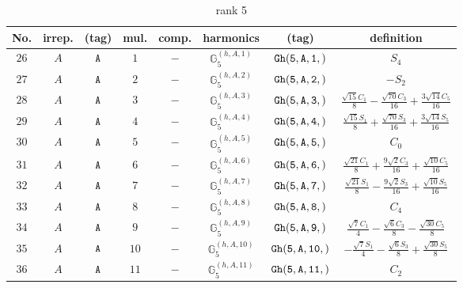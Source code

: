\documentclass[fleqn,8pt]{jsarticle}
\begin{document}
\begin{table}[ht!]
\begin{center}
\caption{rank 5}
\renewcommand{\arraystretch}{1.3}
\begin{tabular}{cccccccc} \hline \hline
No. & irrep. & (tag) & mul. & comp. & harmonics & (tag) & definition \\ \hline
$ 26 $ & $ A $ & $ {\tt A} $ & $ 1 $ & $ - $ & $ \mathbb{G}_{5}^{(h,A,1)} $ & $ {\tt Gh(5,A,1,)} $ & $ S_{4} $ \\
$ 27 $ & $ A $ & $ {\tt A} $ & $ 2 $ & $ - $ & $ \mathbb{G}_{5}^{(h,A,2)} $ & $ {\tt Gh(5,A,2,)} $ & $ - S_{2} $ \\
$ 28 $ & $ A $ & $ {\tt A} $ & $ 3 $ & $ - $ & $ \mathbb{G}_{5}^{(h,A,3)} $ & $ {\tt Gh(5,A,3,)} $ & $ \frac{\sqrt{15} C_{1}}{8} - \frac{\sqrt{70} C_{3}}{16} + \frac{3 \sqrt{14} C_{5}}{16} $ \\
$ 29 $ & $ A $ & $ {\tt A} $ & $ 4 $ & $ - $ & $ \mathbb{G}_{5}^{(h,A,4)} $ & $ {\tt Gh(5,A,4,)} $ & $ \frac{\sqrt{15} S_{1}}{8} + \frac{\sqrt{70} S_{3}}{16} + \frac{3 \sqrt{14} S_{5}}{16} $ \\
$ 30 $ & $ A $ & $ {\tt A} $ & $ 5 $ & $ - $ & $ \mathbb{G}_{5}^{(h,A,5)} $ & $ {\tt Gh(5,A,5,)} $ & $ C_{0} $ \\
$ 31 $ & $ A $ & $ {\tt A} $ & $ 6 $ & $ - $ & $ \mathbb{G}_{5}^{(h,A,6)} $ & $ {\tt Gh(5,A,6,)} $ & $ \frac{\sqrt{21} C_{1}}{8} + \frac{9 \sqrt{2} C_{3}}{16} + \frac{\sqrt{10} C_{5}}{16} $ \\
$ 32 $ & $ A $ & $ {\tt A} $ & $ 7 $ & $ - $ & $ \mathbb{G}_{5}^{(h,A,7)} $ & $ {\tt Gh(5,A,7,)} $ & $ \frac{\sqrt{21} S_{1}}{8} - \frac{9 \sqrt{2} S_{3}}{16} + \frac{\sqrt{10} S_{5}}{16} $ \\
$ 33 $ & $ A $ & $ {\tt A} $ & $ 8 $ & $ - $ & $ \mathbb{G}_{5}^{(h,A,8)} $ & $ {\tt Gh(5,A,8,)} $ & $ C_{4} $ \\
$ 34 $ & $ A $ & $ {\tt A} $ & $ 9 $ & $ - $ & $ \mathbb{G}_{5}^{(h,A,9)} $ & $ {\tt Gh(5,A,9,)} $ & $ \frac{\sqrt{7} C_{1}}{4} - \frac{\sqrt{6} C_{3}}{8} - \frac{\sqrt{30} C_{5}}{8} $ \\
$ 35 $ & $ A $ & $ {\tt A} $ & $ 10 $ & $ - $ & $ \mathbb{G}_{5}^{(h,A,10)} $ & $ {\tt Gh(5,A,10,)} $ & $ - \frac{\sqrt{7} S_{1}}{4} - \frac{\sqrt{6} S_{3}}{8} + \frac{\sqrt{30} S_{5}}{8} $ \\
$ 36 $ & $ A $ & $ {\tt A} $ & $ 11 $ & $ - $ & $ \mathbb{G}_{5}^{(h,A,11)} $ & $ {\tt Gh(5,A,11,)} $ & $ C_{2} $ \\
 \hline \hline
\end{tabular}
\end{center}
\end{table}
\end{document}
